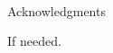 
\clearpage{}
{}

\renewcommand{\baselinestretch}{2}
\small\normalsize
\hbox{\ }
 
\vspace{-.65in}

\begin{center}
\large{Acknowledgments} 
\end{center} 

\vspace{1ex}

If needed.
